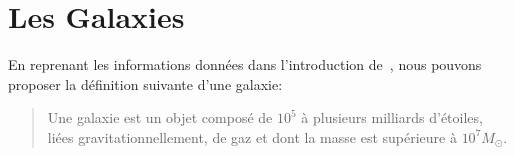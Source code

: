 



	\section{Les Galaxies}%
		En reprenant les informations données dans l'introduction de~\cite{binntre},
		nous pouvons proposer la définition suivante d'une galaxie:
		\begin{quote}
			Une galaxie est un objet composé de $10^5$ à plusieurs milliards d'étoiles, liées gravitationnellement, de gaz et dont la masse
			est supérieure à $10^7M_\odot$.
		\end{quote}


